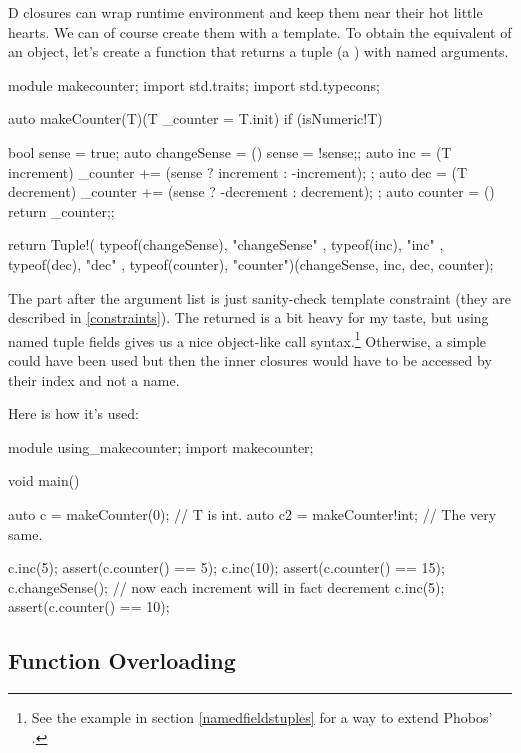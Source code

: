 D closures can wrap runtime environment and keep them near their hot little hearts. We can of course create them with a template. To obtain the equivalent of an object, let's create a function that returns a tuple (a ) with named arguments.

\begin{dcode}
module makecounter;
import std.traits;
import std.typecons;

auto makeCounter(T)(T _counter = T.init) if (isNumeric!T)
{
    bool sense = true;
    auto changeSense = () { sense = !sense;};
    auto inc = (T increment) { _counter += (sense ? increment : -increment); };
    auto dec = (T decrement) { _counter += (sense ? -decrement : decrement); };
    auto counter = () { return _counter;};
    
    return Tuple!( typeof(changeSense), "changeSense"
                 , typeof(inc), "inc"
                 , typeof(dec), "dec"
                 , typeof(counter), "counter")(changeSense, inc, dec, counter);
}
\end{dcode}

The  part after the argument list is just sanity-check template constraint (they are described in \autoref{constraints}). The returned  is a bit heavy for my taste, but using named tuple fields gives us a nice object-like call syntax.\footnote{ See the example in section \ref{namedfieldstuples} for a way to extend Phobos' .} Otherwise, a simple  could have been used but then the inner closures would have to be accessed by their index and not a name.

Here is how it's used:

\begin{dcode}
module using_makecounter;
import makecounter;

void main()
{
    auto c = makeCounter(0); // T is int.
    auto c2 = makeCounter!int; // The very same.

    c.inc(5);
    assert(c.counter() == 5);
    c.inc(10);
    assert(c.counter() == 15);
    c.changeSense(); // now each increment will in fact decrement
    c.inc(5);
    assert(c.counter() == 10);
}
\end{dcode}

\subsection{Function Overloading}\label{functionsoverloading}

